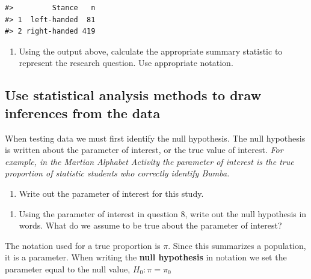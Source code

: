 \documentclass[
]{report}
\providecommand{\tightlist}{%
  \setlength{\itemsep}{0pt}\setlength{\parskip}{0pt}}
\begin{document}
\begin{verbatim}
#>         Stance   n
#> 1  left-handed  81
#> 2 right-handed 419
\end{verbatim}

\begin{enumerate}
\def\labelenumi{\arabic{enumi}.}
\setcounter{enumi}{6}
\tightlist
\item
  Using the output above, calculate the appropriate summary statistic to represent the research question. Use appropriate notation.
\end{enumerate}

\vspace{0.5in}

\hypertarget{use-statistical-analysis-methods-to-draw-inferences-from-the-data}{%
\subsection*{Use statistical analysis methods to draw inferences from the data}\label{use-statistical-analysis-methods-to-draw-inferences-from-the-data}}

When testing data we must first identify the null hypothesis. The null hypothesis is written about the parameter of interest, or the true value of interest. \emph{For example, in the Martian Alphabet Activity the parameter of interest is the true proportion of statistic students who correctly identify Bumba.}

\begin{enumerate}
\def\labelenumi{\arabic{enumi}.}
\setcounter{enumi}{7}
\tightlist
\item
  Write out the parameter of interest for this study.
\end{enumerate}

\vspace{0.8in}

\begin{enumerate}
\def\labelenumi{\arabic{enumi}.}
\setcounter{enumi}{8}
\tightlist
\item
  Using the parameter of interest in question 8, write out the null hypothesis in words. What do we assume to be true about the parameter of interest?
\end{enumerate}

\newpage

The notation used for a true proportion is \(\pi\). Since this summarizes a population, it is a parameter. When writing the \textbf{null hypothesis} in notation we set the parameter equal to the null value, \(H_0: \pi = \pi_0\)
\end{document}
